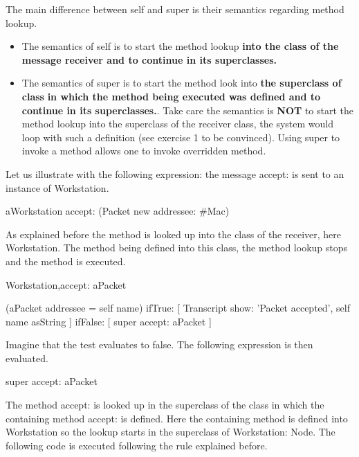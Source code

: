 The main difference between self and super is their semantics 
regarding method lookup. 

\begin{itemize}
\item
The semantics of self is to start the method lookup \textbf{into 
the class of the message receiver and to continue in its superclasses.}\\
\item
The semantics of super is to start the method look into \textbf{the 
superclass of class} \textbf{in which the method being executed was 
defined and to continue in its superclasses.}. Take care the semantics 
is \textbf{NOT} to start the method lookup into the superclass of 
the receiver class, the system would loop with such a definition 
(see exercise 1 to be convinced). Using super to invoke a method 
allows one to invoke overridden method.
\end{itemize}

Let us illustrate with the following expression: the message accept: 
is sent to an instance of Workstation. 

\begin{scode}
aWorkstation accept: (Packet new addressee: \#Mac)
\end{scode}

As explained before the method is looked up into the class of 
the receiver, here Workstation. The method being defined into 
this class, the method lookup stops and the method is executed. 

\begin{scode}
 Workstation\sep{}accept: aPacket

     (aPacket addressee = self name)
         ifTrue: [ Transcript show: 'Packet accepted', self name asString ]
         ifFalse: [ super accept: aPacket ]
\end{scode}

Imagine that the test evaluates to false. The following expression 
is then evaluated.

\begin{scode}
 super accept: aPacket
\end{scode}


The method accept: is looked up in the superclass of the class 
in which the containing method accept: is defined. Here the containing 
method is defined into Workstation so the lookup starts in the 
superclass of Workstation: Node. The following code is executed 
following the rule explained before. 

